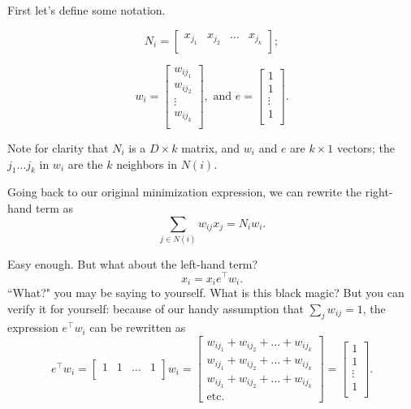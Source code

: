 First let's define some notation.

\[N_i=
\begin{bmatrix}
    x_{j_1} & x_{j_2} & \dots & x_{j_k} \\
\end{bmatrix};
\]

\[w_i=
\begin{bmatrix}
    w_{ij_1} \\
    w_{ij_2} \\
    \vdots \\
    w_{ij_k} \\
\end{bmatrix}, \text{ and }
e=
\begin{bmatrix}
    1 \\
    1 \\
    \vdots \\
    1 \\
\end{bmatrix}.
\]

Note for clarity that $N_i$ is a $D \times k$ matrix, and $w_i$ and $e$ are $k \times 1$ vectors; the $j_1 \dots j_k$ in $w_i$ are the $k$ neighbors in $N(i)$.

Going back to our original minimization expression, we can rewrite the right-hand term as
\[
\sum_{j\in N(i)} w_{ij} x_j=N_i w_i.
\]

Easy enough. But what about the left-hand term?
\[
x_i = x_i e^{\intercal} w_i.
\]
``What?" you may be saying to yourself. What is this black magic? But you can verify it for yourself: because of our handy assumption that $\sum_j w_{ij} = 1$, the expression $e^\intercal w_i$ can be rewritten as
\[
e^\intercal w_i = \begin{bmatrix}
    1 & 1 & \dots & 1 \\
\end{bmatrix} w_i =
\begin{bmatrix}
    w_{ij_1} + w_{ij_2} + \dots + w_{ij_k} \\
    w_{ij_1} + w_{ij_2} + \dots + w_{ij_k} \\
    w_{ij_1} + w_{ij_2} + \dots + w_{ij_k} \\
    \text{etc.}
\end{bmatrix} =
\begin{bmatrix}
    1 \\
    1 \\
    \vdots \\
    1 \\
\end{bmatrix}.
\]

